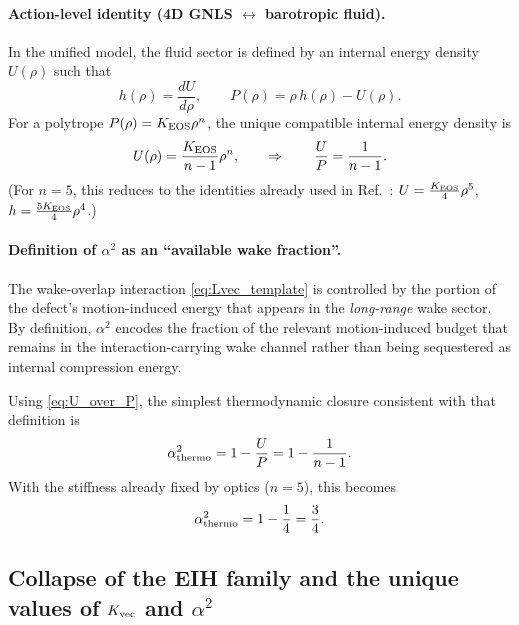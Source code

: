 \documentclass[11pt]{article}
\begin{document}
\paragraph{Action-level identity (4D GNLS $\leftrightarrow$ barotropic fluid).}
In the unified model, the fluid sector is defined by an internal energy density $U(\rho)$ such that
\begin{equation}
  h(\rho)=\frac{dU}{d\rho},\qquad
  P(\rho)=\rho\,h(\rho)-U(\rho).
  \label{eq:thermo_identities}
\end{equation}
For a polytrope $P(\rho)=K_{\rm EOS}\rho^n$, the unique compatible internal energy density is
\begin{equation}
  U(\rho)=\frac{K_{\rm EOS}}{n-1}\rho^n,
  \qquad
  \Rightarrow\qquad
  \frac{U}{P}=\frac{1}{n-1}.
  \label{eq:U_over_P}
\end{equation}
(For $n=5$, this reduces to the identities already used in Ref.~\cite{norris2026_4d_model}:
$U=\tfrac{K_{\rm EOS}}{4}\rho^5$, $h=\tfrac{5K_{\rm EOS}}{4}\rho^4$.)

\paragraph{Definition of $\alpha^2$ as an ``available wake fraction''.}
The wake-overlap interaction \eqref{eq:Lvec_template} is controlled by the portion of the defect's
motion-induced energy that appears in the \emph{long-range} wake sector.
By definition, $\alpha^2$ encodes the fraction of the relevant motion-induced budget that remains
in the interaction-carrying wake channel rather than being sequestered as internal compression energy.

Using \eqref{eq:U_over_P}, the simplest thermodynamic closure consistent with that definition is
\begin{equation}
  \alpha^2_{\rm thermo}
  = 1-\frac{U}{P}
  =1-\frac{1}{n-1}.
  \label{eq:alpha_thermo_general}
\end{equation}
With the stiffness already fixed by optics ($n=5$), this becomes
\begin{equation}
  \alpha^2_{\rm thermo}=1-\frac{1}{4}=\frac{3}{4}.
  \label{eq:alpha_value}
\end{equation}

\subsection{Collapse of the EIH family and the unique values of \texorpdfstring{$K_{\rm vec}$}{K_vec} and \texorpdfstring{$\alpha^2$}{alpha^2}}
\label{sec:1pn-interaction-collapse}
\end{document}
